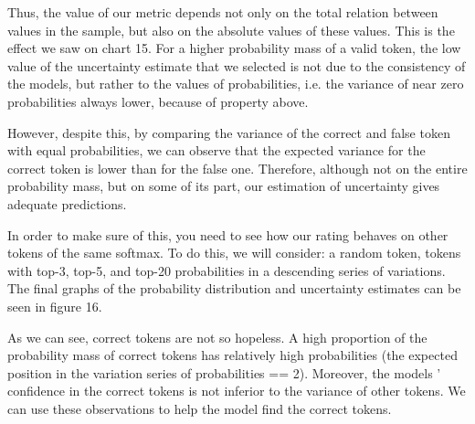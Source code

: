 \documentclass[a4paper,14pt]{extarticle}
\begin{document}
	Thus, the value of our metric depends not only on the total relation between values in the sample, but also on the absolute values of these values. This is the effect we saw on chart 15. For a higher probability mass of a valid token, the low value of the uncertainty estimate that we selected is not due to the consistency of the models, but rather to the values of probabilities, i.e. the variance of near zero probabilities always lower, because of property above.

	However, despite this, by comparing the variance of the correct and false token with equal probabilities, we can observe that the expected variance for the correct token is lower than for the false one. Therefore, although not on the entire probability mass, but on some of its part, our estimation of uncertainty gives adequate predictions.

	In order to make sure of this, you need to see how our rating behaves on other tokens of the same softmax. To do this, we will consider: a random token, tokens with top-3, top-5, and top-20 probabilities in a descending series of variations. The final graphs of the probability distribution and uncertainty estimates can be seen in figure 16.
	
	As we can see, correct tokens are not so hopeless. A high proportion of the probability mass of correct tokens has relatively high probabilities (the expected position in the variation series of probabilities == 2). Moreover, the models ' confidence in the correct tokens is not inferior to the variance of other tokens. We can use these observations to help the model find the correct tokens.
	
	\begin{figure}[H]
	\end{figure}
	
\end{document}
